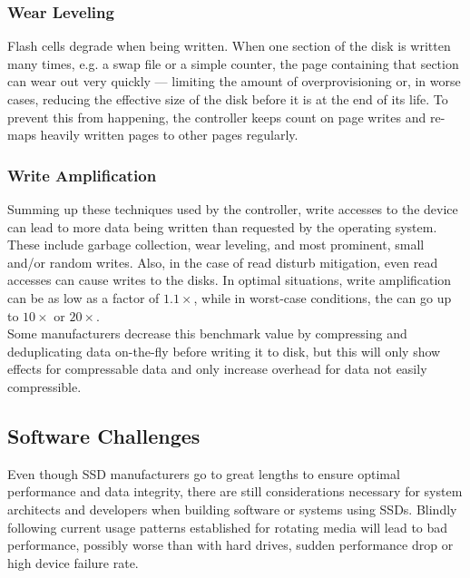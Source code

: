 \documentclass{acm_proc_article-sp}
\begin{document}
\subsubsection*{Wear Leveling}
Flash cells degrade when being written. When one section of the disk is written many times, e.g. a swap file or a simple counter, the page containing that section can wear out very quickly --- limiting the amount of overprovisioning or, in worse cases, reducing the effective size of the disk before it is at the end of its life. To prevent this from happening, the controller keeps count on page writes and re-maps heavily written pages to other pages regularly.

\subsubsection*{Write Amplification}
Summing up these techniques used by the controller, write accesses to the device can lead to more data being written than requested by the operating system. These include garbage collection, wear leveling, and most prominent, small and/or random writes.
Also, in the case of read disturb mitigation, even read accesses can cause writes to the disks.
In optimal situations, write amplification can be as low as a factor of $1.1\times$, while in worst-case conditions, the can go up to $10\times$ or $20\times$.
\\
Some manufacturers decrease this benchmark value by compressing and deduplicating data on-the-fly before writing it to disk, but this will only show effects for compressable data and only increase overhead for data not easily compressible.

\subsection{Software Challenges}
Even though SSD manufacturers go to great lengths to ensure optimal performance and data integrity, there are still considerations necessary for system architects and developers when building software or systems using SSDs. Blindly following current usage patterns established for rotating media will lead to bad performance, possibly worse than with hard drives, sudden performance drop or high device failure rate.
\end{document}
